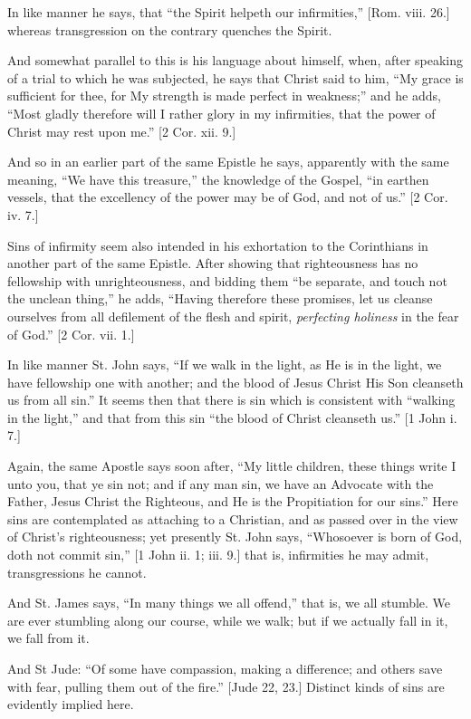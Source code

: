In like manner he says, that ``the Spirit helpeth our
infirmities,'' [Rom. viii. 26.] whereas transgression on the
contrary quenches the Spirit.

And somewhat parallel to this is his language about himself, when,
after speaking of a trial to which he was subjected, he says that
Christ said to him, ``My grace is sufficient for thee, for My
strength is made perfect in weakness;'' and he adds, ``Most
gladly therefore will I rather glory in my infirmities, that the power
of Christ may rest upon me.'' [2 Cor. xii. 9.]

And so in an earlier part of the same Epistle he says, apparently
with the same meaning, ``We have this treasure,'' the
knowledge of the Gospel, ``in earthen vessels, that the excellency
of the power may be of God, and not of us.'' [2 Cor. iv. 7.]

Sins of infirmity seem also intended in his exhortation to the
Corinthians in another part of the same Epistle. After showing that
righteousness has no fellowship with unrighteousness, and bidding them
``be separate, and touch not the unclean thing,'' he adds,
``Having therefore these promises, let us cleanse ourselves from
all defilement of the flesh and spirit, \emph{perfecting holiness} in the
fear of God.'' [2 Cor. vii. 1.]

In like manner St. John says, ``If we walk in the light, as He
is in the light, we have fellowship one with another; and the blood of
Jesus Christ His Son cleanseth us from all sin.'' It seems then
that there is sin which is consistent with ``walking in the
light,'' and that from this sin ``the blood of Christ
cleanseth us.'' [1 John i. 7.]

Again, the same Apostle says soon after, ``My little children,
these things write I unto you, that ye sin not; and if any man sin, we
have an Advocate with the Father, Jesus Christ the Righteous, and He
is the Propitiation for our sins.'' Here sins are contemplated as
attaching to a Christian, and as passed over in the view of Christ's
righteousness; yet presently St. John says, ``Whosoever is born of
God, doth not commit sin,'' [1 John ii. 1; iii. 9.] that is,
infirmities he may admit, transgressions he cannot.

And St. James says, ``In many things we all offend,'' that
is, we all stumble. We are ever stumbling along our course, while we
walk; but if we actually fall in it, we fall from it.

And St Jude: ``Of some have compassion, making a difference;
and others save with fear, pulling them out of the fire.'' [Jude
22, 23.] Distinct kinds of sins are evidently implied here.

